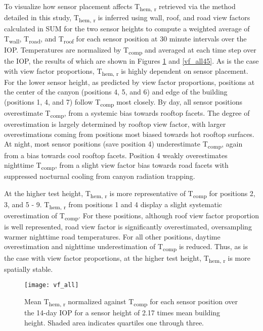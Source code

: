 \begin{bibunit}
To visualize how sensor placement affects T\textsubscript{hem, r} retrieved via the method detailed in this study, T\textsubscript{hem, r} is inferred using wall, roof, and road view factors calculated in SUM for the two sensor heights to compute a weighted average of T\textsubscript{wall}, T\textsubscript{road}, and T\textsubscript{roof} for each sensor position at 30 minute intervals over the IOP. Temperatures are normalized by T\textsubscript{comp} and averaged at each time step over the IOP, the results of which are shown in Figures \ref{vf_all} and \ref{vf_all45}. As is the case with view factor proportions, T\textsubscript{hem, r} is highly dependent on sensor placement. For the lower sensor height, as predicted by view factor proportions, positions at the center of the canyon (positions 4, 5, and 6) and edge of the building (positions 1, 4, and 7) follow T\textsubscript{comp} most closely. By day, all sensor positions overestimate T\textsubscript{comp}, from a systemic bias towards rooftop facets. The degree of overestimation is largely determined by rooftop view factor, with larger overestimations coming from positions most biased towards hot rooftop surfaces. At night, most sensor positions (save position 4) underestimate T\textsubscript{comp}, again from a bias towards cool rooftop facets. Position 4 weakly overestimates nighttime T\textsubscript{comp}, from a slight view factor bias towards road facets with suppressed nocturnal cooling from canyon radiation trapping. 

At the higher test height, T\textsubscript{hem, r} is more representative of T\textsubscript{comp} for positions 2, 3, and 5 - 9. T\textsubscript{hem, r} from positions 1 and 4 display a slight systematic overestimation of T\textsubscript{comp}. For these positions, although roof view factor proportion is well represented, road view factor is significantly overestimated, oversampling warmer nighttime road temperatures. For all other positions, daytime overestimation and nighttime underestimation of T\textsubscript{comp} is reduced. Thus, as is the case with view factor proportions, at the higher test height, T\textsubscript{hem, r} is more spatially stable.
 
   \begin{figure}[H]
 	\centering
 	\texttt{[image: vf\_all]}
 	\caption{Mean T\textsubscript{hem, r} normalized against T\textsubscript{comp} for each sensor position over the 14-day IOP for a sensor height of 2.17 times mean building height. Shaded area indicates quartiles one through three.}
 	\label{vf_all}
 \end{figure}


\end{bibunit}
